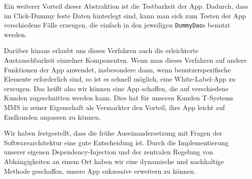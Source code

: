 	Ein weiterer Vorteil dieser Abstraktion ist die Testbarkeit der App. Dadurch, dass im Click-Dummy feste Daten hinterlegt sind, kann man sich zum Testen der App verschiedene Fälle erzeugen, die einfach in den jeweiligen \texttt{DummyDao}s benutzt werden.
	
	Darüber hinaus erlaubt uns dieses Verfahren auch die erleichterte Austauschbarkeit einzelner Komponenten. Wenn man dieses Verfahren auf andere Funktionen der App anwendet, insbesondere dann, wenn benutzerspezifische Elemente erforderlich sind, so ist es schnell möglich, eine White-Label-App zu erzeugen. Das heißt also wir können eine App schaffen, die auf verschiedene Kunden zugeschnitten werden kann. Dies hat für unseren Kunden T-Systems MMS in seiner Eigenschaft als Vermarkter den Vorteil, ihre App leicht auf Endkunden anpassen zu können.
	
	Wir haben festgestellt, dass die frühe Auseinandersetzung mit Fragen der Softwarearchitektur eine gute Entscheidung ist. Durch die Implementierung unserer eigenen Dependency-Injection und der zentralen Regelung von Abhängigkeiten an einem Ort haben wir eine dynamische und nachhaltige Methode geschaffen, unsere App sukzessive erweitern zu können.